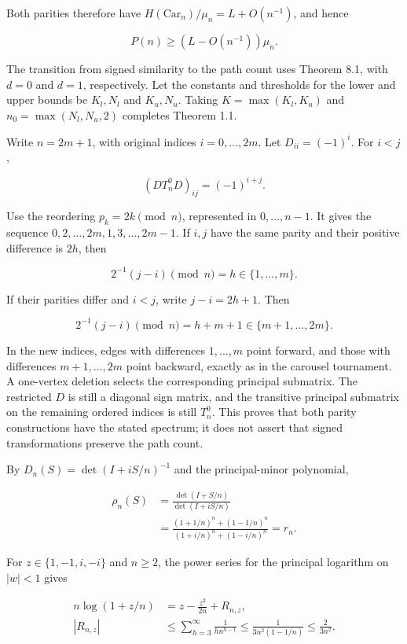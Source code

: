 \documentclass[11pt,a4paper]{article}
\begin{document}
Both parities therefore have \(H(\mathrm{Car}_n)/\mu_n=L+O(n^{-1})\), and hence

\[
P(n)\ge(L-O(n^{-1}))\mu_n.
\]

The transition from signed similarity to the path count uses Theorem 8.1, with \(d=0\) and \(d=1\), respectively. Let the constants and thresholds for the lower and upper bounds be \(K_l,N_l\) and \(K_u,N_u\). Taking \(K=\max(K_l,K_u)\) and \(n_0=\max(N_l,N_u,2)\) completes Theorem 1.1.

Write \(n=2m+1\), with original indices \(i=0,\ldots,2m\). Let \(D_{ii}=(-1)^i\). For \(i<j\),

\[
(DT_n^0D)_{ij}=(-1)^{i+j}.
\]

Use the reordering \(p_k=2k\pmod n\), represented in \(0,\ldots,n-1\). It gives the sequence \(0,2,\ldots,2m,1,3,\ldots,2m-1\). If \(i,j\) have the same parity and their positive difference is \(2h\), then

\[
2^{-1}(j-i)\pmod n=h\in\{1,\ldots,m\}.
\]

If their parities differ and \(i<j\), write \(j-i=2h+1\). Then

\[
2^{-1}(j-i)\pmod n=h+m+1\in\{m+1,\ldots,2m\}.
\]

In the new indices, edges with differences \(1,\ldots,m\) point forward, and those with differences \(m+1,\ldots,2m\) point backward, exactly as in the carousel tournament. A one-vertex deletion selects the corresponding principal submatrix. The restricted \(D\) is still a diagonal sign matrix, and the transitive principal submatrix on the remaining ordered indices is still \(T_n^0\). This proves that both parity constructions have the stated spectrum; it does not assert that signed transformations preserve the path count.

By \(D_n(S)=\det(I+iS/n)^{-1}\) and the principal-minor polynomial,

\[
\begin{aligned}
\rho_n(S)&=\frac{\det(I+S/n)}{\det(I+iS/n)}\\
&=\frac{(1+1/n)^n+(1-1/n)^n}
{(1+i/n)^n+(1-i/n)^n}=r_n.
\end{aligned}
\]

For \(z\in\{1,-1,i,-i\}\) and \(n\ge2\), the power series for the principal logarithm on \(|w|<1\) gives

\[
\begin{aligned}
n\log(1+z/n)&=z-\frac{z^2}{2n}+R_{n,z},\\
|R_{n,z}|&\le\sum_{h=3}^{\infty}\frac1{h n^{h-1}}
\le\frac1{3n^2(1-1/n)}\le\frac2{3n^2}.
\end{aligned}
\]
\end{document}
